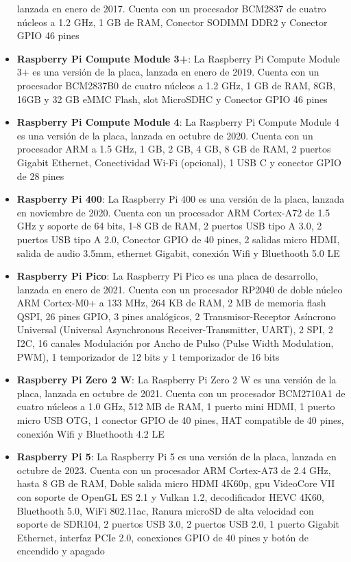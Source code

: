 \begin{itemize}
            lanzada en enero de 2017. Cuenta con un procesador BCM2837 de cuatro n\'ucleos a 1.2 GHz, 1 GB de RAM,
            Conector SODIMM DDR2 y Conector GPIO 46 pines \cite{Santamaria2023}
        \item \textbf{Raspberry Pi Compute Module 3+}: La Raspberry Pi Compute Module 3+ es una versi\'on de la placa,
            lanzada en enero de 2019. Cuenta con un procesador BCM2837B0 de cuatro n\'ucleos a 1.2 GHz, 1 GB de RAM, 8GB, 16GB y 32 GB eMMC Flash,
            slot MicroSDHC y Conector GPIO 46 pines \cite{Santamaria2023}
        \item \textbf{Raspberry Pi Compute Module 4}: La Raspberry Pi Compute Module 4 es una versi\'on de la placa,
            lanzada en octubre de 2020. Cuenta con un procesador ARM a 1.5 GHz, 1 GB, 2 GB, 4 GB, 8 GB de RAM,
            2 puertos Gigabit Ethernet, Conectividad Wi-Fi (opcional), 1 USB C y conector GPIO de 28 pines \cite{Santamaria2023}
        \item \textbf{Raspberry Pi 400}: La Raspberry Pi 400 es una versi\'on de la placa, lanzada en noviembre de 2020.
            Cuenta con un procesador ARM Cortex-A72 de 1.5 GHz y soporte de 64 bits, 1-8 GB de RAM, 2 puertos USB tipo A 3.0, 2 puertos USB tipo A 2.0,
            Conector GPIO de 40 pines, 2 salidas micro HDMI, salida de audio 3.5mm, ethernet Gigabit, conexi\'on Wifi y Bluethooth 5.0 LE \cite{Santamaria2023}
        \item \textbf{Raspberry Pi Pico}: La Raspberry Pi Pico es una placa de desarrollo, lanzada en enero de 2021.
            Cuenta con un procesador RP2040 de doble n\'ucleo ARM Cortex-M0+ a 133 MHz, 264 KB de RAM, 2 MB de memoria flash QSPI,
            26 pines GPIO, 3 pines anal\'ogicos, 2 Transmisor-Receptor As\'incrono Universal (Universal Asynchronous Receiver-Transmitter, UART), 2 SPI, 2 I2C, 16 canales Modulaci\'on por Ancho de Pulso (Pulse Width Modulation, PWM), 1 temporizador de 12 bits y 1 temporizador de 16 bits \cite{Santamaria2023}
        \item \textbf{Raspberry Pi Zero 2 W}: La Raspberry Pi Zero 2 W es una versi\'on de la placa, lanzada en octubre de 2021.
            Cuenta con un procesador BCM2710A1 de cuatro n\'ucleos a 1.0 GHz, 512 MB de RAM, 1 puerto mini HDMI, 1 puerto micro USB OTG, 1 conector GPIO de 40 pines, HAT compatible de 40 pines,
            conexi\'on Wifi y Bluethooth 4.2 LE \cite{Santamaria2023}
        \item \textbf{Raspberry Pi 5}: La Raspberry Pi 5 es una versi\'on de la placa, lanzada en octubre de 2023. 
            Cuenta con un procesador ARM Cortex-A73 de 2.4 GHz, hasta 8 GB de RAM, Doble salida micro HDMI 4K60p, gpu VideoCore VII con soporte 
            de OpenGL ES 2.1 y Vulkan 1.2, decodificador HEVC 4K60, Bluethooth 5.0, WiFi 802.11ac, Ranura microSD de alta velocidad con soporte de SDR104, 
            2 puertos USB 3.0, 2 puertos USB 2.0, 1 puerto Gigabit Ethernet, interfaz PCIe 2.0, conexiones GPIO de 40 pines y bot\'on de encendido y apagado \cite{Santamaria2023}
    \end{itemize}
    